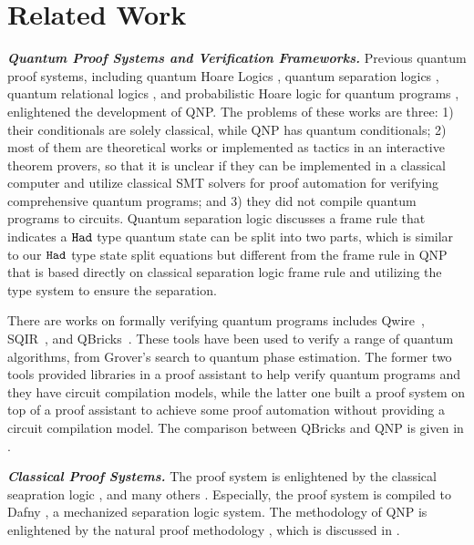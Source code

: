 \section{Related Work}
\label{sec:related}

\noindent\textbf{\textit{Quantum Proof Systems and Verification Frameworks.}}
Previous quantum proof systems, including quantum Hoare Logics \cite{qhoare,qhoreusage,10.1145/3456877,10.1007/s00165-018-0465-3},
quantum separation logics \cite{qseplocal,qsepa}, quantum relational logics \cite{relationlogic,10.1145/3290346}, and probabilistic Hoare logic for quantum programs \cite{10.1007/978-3-642-10622-4_7}, enlightened the development of QNP. The problems of these works are three: 1) their conditionals are solely classical, while QNP has quantum conditionals; 2) most of them are theoretical works or implemented as tactics in an interactive theorem provers, so that it is unclear if they can be implemented in a classical computer and utilize classical SMT solvers for proof automation for verifying comprehensive quantum programs; and 3) they did not compile quantum programs to circuits. 
Quantum separation logic \cite{qseplocal} discusses a frame rule that indicates a $\texttt{Had}$ type quantum state can be split into two parts, which is similar to our $\texttt{Had}$ type state split equations but different from the frame rule in QNP that is based directly on classical separation logic frame rule and utilizing the \qafny type system to ensure the separation. 

There are works on formally verifying quantum programs includes Qwire~\cite{RandThesis}, SQIR~\cite{PQPC}, and QBricks~\cite{qbricks}. These tools have been used to verify a range of quantum algorithms, from Grover's search to quantum phase estimation.
The former two tools provided libraries in a proof assistant to help verify quantum programs and they have circuit compilation models, while the latter one built a proof system on top of a proof assistant to achieve some proof automation without providing a circuit compilation model. The comparison between QBricks and QNP is given in .

\noindent\textbf{\textit{Classical Proof Systems.}}
The \qafny proof system is enlightened by the classical seapration logic \cite{separationlogic}, and many others \cite{10.1145/3453483.3454087,arxiv.1609.00919,10.1007/978-3-319-89960-2_13,10.1007/978-3-319-89960-2_2,nat-proof-fun}. Especially, the \qafny proof system is compiled to Dafny \cite{10.1007/978-3-642-17511-4_20}, a mechanized separation logic system. The methodology of QNP is enlightened by the natural proof methodology \cite{nat-proof-fun,nat-proof-frame,10.1145/2103621.2103673}, which is discussed in .




